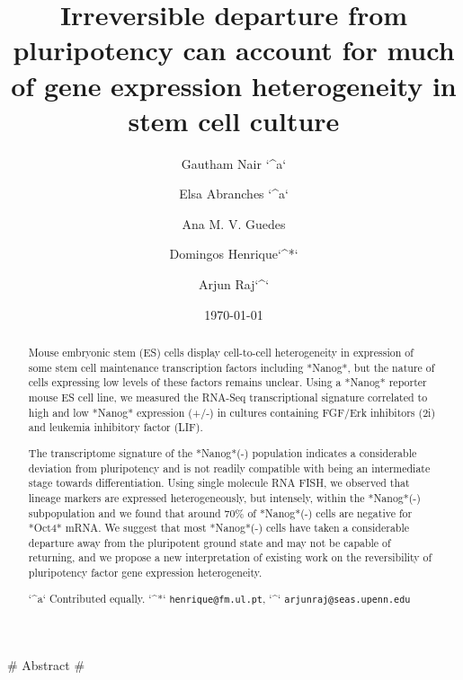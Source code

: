 \documentclass[aps,prl,twocolumn,superscriptaddress]{revtex4}
\begin{document}
\title{Irreversible departure from pluripotency can account for much of gene expression heterogeneity in stem cell culture}












\author{Gautham Nair `^a`}




\author{Elsa Abranches `^a`}
\author{Ana M. V. Guedes}
\author{Domingos Henrique`^*`}
\author{Arjun Raj`^\dagger`}









\date{\today}

# Abstract #

\begin{abstract}
Mouse embryonic stem (ES) cells display cell-to-cell heterogeneity in expression of some stem cell maintenance transcription factors including *Nanog*, but the nature of cells expressing low levels of these factors remains unclear. Using a *Nanog* reporter mouse ES cell line, we measured the RNA-Seq transcriptional signature correlated to high and low *Nanog* expression (+/-) in cultures containing FGF/Erk inhibitors (2i) and leukemia inhibitory factor (LIF). 

The transcriptome signature of the *Nanog*(-) population indicates a considerable deviation from pluripotency and is not readily compatible with being an intermediate stage towards differentiation.
Using single molecule RNA FISH, we observed that lineage markers are expressed heterogeneously, but intensely, within the *Nanog*(-) subpopulation and we found that around 70\% of *Nanog*(-) cells are negative for *Oct4* mRNA. We suggest that most *Nanog*(-) cells have taken a considerable departure away from the pluripotent ground state and may not be capable of returning, and we propose a new interpretation of existing work on the reversibility of pluripotency factor gene expression heterogeneity. 

`^a` Contributed equally. `^*` \verb+henrique@fm.ul.pt+, `^\dagger` \verb+arjunraj@seas.upenn.edu+
\end{abstract}
\end{document}
